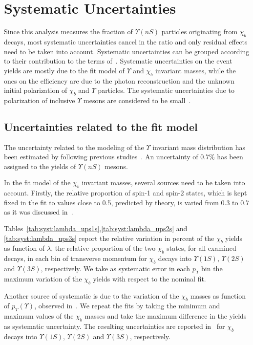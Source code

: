 \section[Systematic]{Systematic Uncertainties}
\label{sec:syst}

Since this analysis measures the fraction of $\Upsilon(nS)$ particles
originating from $\chi_b$ decays, most systematic uncertainties cancel in the
ratio and only residual effects need to be taken into account. Systematic
uncertainties can be grouped according to their contribution to the terms
of~. Systematic uncertainties on the event yields are mostly
due to the fit model of $\Upsilon$ and $\chi_b$ invariant masses, while the
ones on the efficiency are due to the photon reconstruction and the unknown
initial polarization of $\chi_b$ and $\Upsilon$ particles. The systematic uncertainties due to 
polarization of inclusive $\Upsilon$ mesons are considered to be
small~\cite{Aaij:2013yaa,Aaij:2014nwa}.
 

\subsection{Uncertainties related to the fit model}

The uncertainty related to the modeling of the $\Upsilon$ invariant mass
distribution has been estimated by following previous
studies~\cite{Aaij:2013yaa}. An uncertainty of 0.7\% has been assigned to the
yields of $\Upsilon(nS)$ mesons.

In the fit model of the $\chi_b$ invariant masses, several sources need to be
taken into account. Firstly, the relative proportion of spin-1 and spin-2
states, which is kept fixed in the fit to values close to 0.5, predicted by
theory, is varied from 0.3 to 0.7 as it was discussed in~.


Tables~\ref{tab:syst:lambda_ups1s},\ref{tab:syst:lambda_ups2s} and
\ref{tab:syst:lambda_ups3s} report the relative variation in percent of the
$\chi_b$ yields as function of $\lambda$, the relative proportion of the two
$\chi_b$ states, for all examined decays, in each bin of transverse momentum
for $\chi_b$ decays into $\Upsilon(1S)$, $\Upsilon(2S)$ and $\Upsilon(3S)$,
respectively. We take as systematic error in each $p_T$ bin the maximum
variation of the $\chi_b$ yields with respect to the nominal fit.

Another source of systematic is due to the variation of the $\chi_b$ masses as
function of $p_T(\Upsilon)$, observed in~. We repeat the fits by
taking the minimum and maximum values of the $\chi_b$ masses and take the
maximum difference in the yields as systematic uncertainty. The resulting
uncertainties are reported
in~ for $\chi_b$
decays into $\Upsilon(1S)$, $\Upsilon(2S)$ and $\Upsilon(3S)$, respectively.
 
